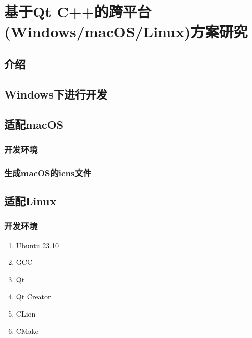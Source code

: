 \chapter{基于Qt C++的跨平台(Windows/macOS/Linux)方案研究}
\label{chapter:10}

\section{介绍}

\section{Windows下进行开发}

\section{适配macOS}

\subsection{开发环境}

\subsection{生成macOS的icns文件}

\section{适配Linux}

\subsection{开发环境}

\begin{enumerate}
	\item Ubuntu 23.10
	\item GCC
	\item Qt
	\item Qt Creator
	\item CLion
	\item CMake
\end{enumerate}
